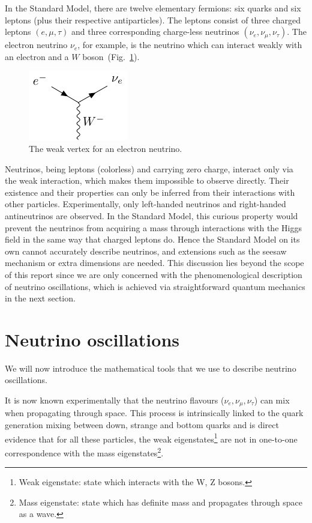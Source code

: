 In the Standard Model, there are twelve elementary fermions: six quarks and six
leptons (plus their respective antiparticles). The leptons consist of three
charged leptons $(e, \mu, \tau)$ and three corresponding charge-less neutrinos
$(\nu_e, \nu_\mu, \nu_\tau)$. The electron neutrino $\nu_e$, for example, is
the neutrino which can interact weakly with an electron and a
$W$ boson~(Fig.~\ref{fig:weak_vertex}). 

\begin{figure}
	\includegraphics{images/weak_vertex.pdf}
	\captionsetup{justification=centering}
	\caption{The weak vertex for an electron neutrino.}
	\label{fig:weak_vertex}
\end{figure}

Neutrinos, being leptons (colorless) and carrying zero charge, interact only via the weak
interaction, which makes them impossible to observe directly. Their existence
and their properties can only be inferred from their interactions with other
particles.
Experimentally, only left-handed neutrinos and right-handed
antineutrinos are observed. In the Standard Model, this curious property would
prevent the neutrinos from acquiring a mass through interactions with the
Higgs field in the same way that charged leptons do\cite{schwichtenberg}. Hence
the Standard Model on its own cannot accurately describe neutrinos, and
extensions such as the seesaw mechanism or extra dimensions are needed. This
discussion lies beyond the scope of this report since we are only concerned
with the phenomenological description of neutrino oscillations, which is
achieved via straightforward quantum mechanics in the next section.

\section{Neutrino oscillations}
We will now introduce the mathematical tools that we use to describe neutrino
oscillations. 

It is now known experimentally that 
the neutrino flavours ($\nu_e, \nu_\mu, \nu_\tau$) can mix when propagating through
space\cite{superk}. This process is intrinsically linked to the quark generation
mixing between down, strange and bottom quarks\cite{pdg_ckm}
and is direct evidence that for all these particles,
the weak eigenstates\footnote{Weak eigenstate: state which interacts with the W, Z bosons.} are not in one-to-one correspondence with the mass
eigenstates\footnote{Mass eigenstate: state which has definite mass and
propagates through space as a wave.}.

